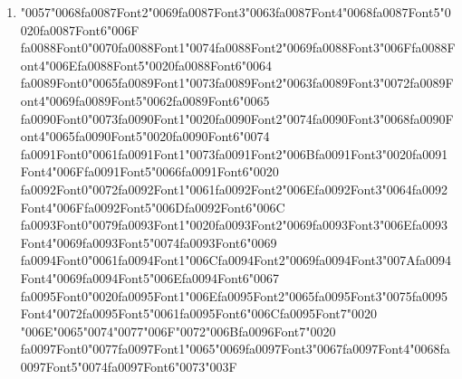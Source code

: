 \documentclass[11pt]{article}
\begin{document}
\begin{enumerate}[label=Q\arabic*., leftmargin=*]
\item {\char"0057}{\char"0068}{\csname fa0087Font2\endcsname\char"0069}{\csname fa0087Font3\endcsname\char"0063}{\csname fa0087Font4\endcsname\char"0068}{\csname fa0087Font5\endcsname\char"0020}{\csname fa0087Font6\endcsname\char"006F} {\csname fa0088Font0\endcsname\char"0070}{\csname fa0088Font1\endcsname\char"0074}{\csname fa0088Font2\endcsname\char"0069}{\csname fa0088Font3\endcsname\char"006F}{\csname fa0088Font4\endcsname\char"006E}{\csname fa0088Font5\endcsname\char"0020}{\csname fa0088Font6\endcsname\char"0064} {\csname fa0089Font0\endcsname\char"0065}{\csname fa0089Font1\endcsname\char"0073}{\csname fa0089Font2\endcsname\char"0063}{\csname fa0089Font3\endcsname\char"0072}{\csname fa0089Font4\endcsname\char"0069}{\csname fa0089Font5\endcsname\char"0062}{\csname fa0089Font6\endcsname\char"0065} {\csname fa0090Font0\endcsname\char"0073}{\csname fa0090Font1\endcsname\char"0020}{\csname fa0090Font2\endcsname\char"0074}{\csname fa0090Font3\endcsname\char"0068}{\csname fa0090Font4\endcsname\char"0065}{\csname fa0090Font5\endcsname\char"0020}{\csname fa0090Font6\endcsname\char"0074} {\csname fa0091Font0\endcsname\char"0061}{\csname fa0091Font1\endcsname\char"0073}{\csname fa0091Font2\endcsname\char"006B}{\csname fa0091Font3\endcsname\char"0020}{\csname fa0091Font4\endcsname\char"006F}{\csname fa0091Font5\endcsname\char"0066}{\csname fa0091Font6\endcsname\char"0020} {\csname fa0092Font0\endcsname\char"0072}{\csname fa0092Font1\endcsname\char"0061}{\csname fa0092Font2\endcsname\char"006E}{\csname fa0092Font3\endcsname\char"0064}{\csname fa0092Font4\endcsname\char"006F}{\csname fa0092Font5\endcsname\char"006D}{\csname fa0092Font6\endcsname\char"006C} {\csname fa0093Font0\endcsname\char"0079}{\csname fa0093Font1\endcsname\char"0020}{\csname fa0093Font2\endcsname\char"0069}{\csname fa0093Font3\endcsname\char"006E}{\csname fa0093Font4\endcsname\char"0069}{\csname fa0093Font5\endcsname\char"0074}{\csname fa0093Font6\endcsname\char"0069} {\csname fa0094Font0\endcsname\char"0061}{\csname fa0094Font1\endcsname\char"006C}{\csname fa0094Font2\endcsname\char"0069}{\csname fa0094Font3\endcsname\char"007A}{\csname fa0094Font4\endcsname\char"0069}{\csname fa0094Font5\endcsname\char"006E}{\csname fa0094Font6\endcsname\char"0067} {\csname fa0095Font0\endcsname\char"0020}{\csname fa0095Font1\endcsname\char"006E}{\csname fa0095Font2\endcsname\char"0065}{\csname fa0095Font3\endcsname\char"0075}{\csname fa0095Font4\endcsname\char"0072}{\csname fa0095Font5\endcsname\char"0061}{\csname fa0095Font6\endcsname\char"006C}{\csname fa0095Font7\endcsname\char"0020} {\char"006E}{\char"0065}{\char"0074}{\char"0077}{\char"006F}{\char"0072}{\char"006B}{\csname fa0096Font7\endcsname\char"0020} {\csname fa0097Font0\endcsname\char"0077}{\csname fa0097Font1\endcsname\char"0065}{\char"0069}{\csname fa0097Font3\endcsname\char"0067}{\csname fa0097Font4\endcsname\char"0068}{\csname fa0097Font5\endcsname\char"0074}{\csname fa0097Font6\endcsname\char"0073}{\char"003F}\\

\end{enumerate}
\end{document}
